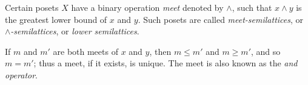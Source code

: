 \documentclass[12pt]{article}
\begin{document}
Certain posets $X$ have a binary operation \emph{meet} denoted by $\land$, such that $x \land y$ is the greatest lower bound of $x$ and $y$. Such posets are called \emph{meet-semilattices}, or \emph{$\land$-semilattices}, or \emph{lower semilattices}.

If $m$ and $m'$ are both meets of $x$ and $y$, then $m \leq m'$ and $m \geq m'$, and so $m = m'$; thus a meet, if it exists, is unique.  The meet is also known as the \emph{and operator}.
\end{document}
